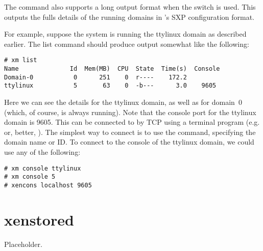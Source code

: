 The  command also supports a long output format when the
 switch is used.  This outputs the fulls details of the
running domains in \xend's SXP configuration format.

For example, suppose the system is running the ttylinux domain as
described earlier.  The list command should produce output somewhat
like the following:
\begin{verbatim}
# xm list
Name              Id  Mem(MB)  CPU  State  Time(s)  Console
Domain-0           0      251    0  r----    172.2        
ttylinux           5       63    0  -b---      3.0    9605
\end{verbatim}

Here we can see the details for the ttylinux domain, as well as for
domain~0 (which, of course, is always running).  Note that the console
port for the ttylinux domain is 9605.  This can be connected to by TCP
using a terminal program (e.g.  or, better,
).  The simplest way to connect is to use the
 command, specifying the domain name or ID.  To
connect to the console of the ttylinux domain, we could use any of the
following:
\begin{verbatim}
# xm console ttylinux
# xm console 5
# xencons localhost 9605
\end{verbatim}

\section{xenstored}

Placeholder.
